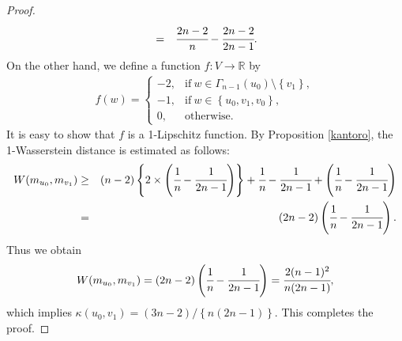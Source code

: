 \documentclass[leqno,12pt]{amsart} %
\theoremstyle{plain} %
\theoremstyle{definition} %
\begin{document}
\begin{proof}
\begin{eqnarray*}
&=& \cfrac{2n-2}{n} -\cfrac{2n-2}{2n-1}.
\end{eqnarray*}
On the other hand, we define a function $f : V \to \mathbb{R}$ by
\begin{eqnarray*}
f(w)=
\begin{cases}
-2, & \mathrm{if}\ w \in \Gamma_{n-1} (u_0) \setminus \left\{ v_1 \right\},\\
-1, & \mathrm{if}\ w \in \left\{u_0, v_1, v_0 \right\},\\
0, & \mathrm{otherwise}.
\end{cases}
\end{eqnarray*}
It is easy to show that $f$ is a 1-Lipschitz function. By Proposition \ref{kantoro}, the 1-Wasserstein distance is estimated as follows:
\begin{eqnarray*}
W(m_{u_0}, m_{v_1}) &\geq& (n - 2) \left\{ 2 \times \left( \cfrac{1}{n} - \cfrac{1}{2n-1} \right) \right\} + \cfrac{1}{n} - \cfrac{1}{2n-1} + \left( \cfrac{1}{n} - \cfrac{1}{2n-1} \right) \\
&=& (2n-2) \left( \cfrac{1}{n} - \cfrac{1}{2n-1} \right).
\end{eqnarray*}
Thus we obtain 
\begin{eqnarray*}
W(m_{u_0}, m_{v_1}) = (2n-2) \left( \cfrac{1}{n} - \cfrac{1}{2n-1} \right) = \cfrac{2 (n-1)^2}{n(2n-1)},
\end{eqnarray*}
which implies $\kappa(u_0, v_1) = (3n - 2)/\left\{n(2n-1)\right\}$. This completes the proof.
\end{proof}
\end{document}
